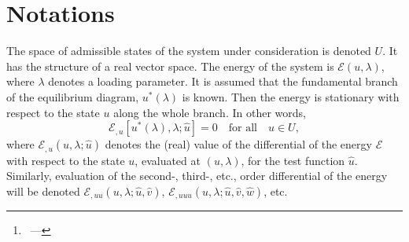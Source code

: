 \documentclass[12pt, final]{scrartcl}
\theoremstyle{definition}
\newcommand{\E}{\mathcal E}
\begin{document}
\title{\sbtitle}
\author{\sbauthor\thanks{\sbaddress~--- \sbemail}}
\maketitle

\begin{abstract}
  These are my notes on the LSK method for the analysis of the stability and bifurcation(s) of a conservative
  system. These notes are based on several references: Koiter's initial PhD thesis~\parencite{koit1945} as well as some
  graphical illustrations from his lecture notes~\parencite{koit2009}. I enjoyed the concise presentation of
  \textcite{nguy2000} as well as the lecture notes of \textcite{tria2017}. Finally, the chapter by \textcite{poti1987}
  helped me clear some issues.

  These notes by Sébastien Brisard are licensed under a Creative Commons Attribution 4.0 International License. To view
  a copy of this license, visit \url{http://creativecommons.org/licenses/by/4.0/}.

  I hope the reader will find these notes useful, even though there are still a few points which I do not fully
  understand (they are clearly indicated in the text).
\end{abstract}

\section{Notations}

The space of admissible states of the system under consideration is denoted $U$. It has the structure of a real vector
space. The energy of the system is \(\E(u, \lambda)\), where \(\lambda\) denotes a loading parameter. It is assumed that the
fundamental branch of the equilibrium diagram, \(u^{\ast}(\lambda)\) is known. Then the energy is stationary with respect to the
state \(u\) along the whole branch. In other words,
\begin{equation}
  \E_{,u}[u^{\ast}(\lambda), \lambda; \hat{u}]=0 \quad \text{for all} \quad \hat{u}\in U,
\end{equation}
where \(\E_{,u}(u, \lambda; \hat{u})\) denotes the (real) value of the differential of the energy \(\E\) with respect to the
state \(u\), evaluated at \((u, \lambda)\), for the test function \(\hat{u}\). Similarly, evaluation of the second-, third-,
etc., order differential of the energy will be denoted \(\E_{,uu}(u, \lambda; \hat{u}, \hat{v})\),
\(\E_{,uuu}(u, \lambda; \hat{u}, \hat{v}, \hat{w})\), etc.
\end{document}
